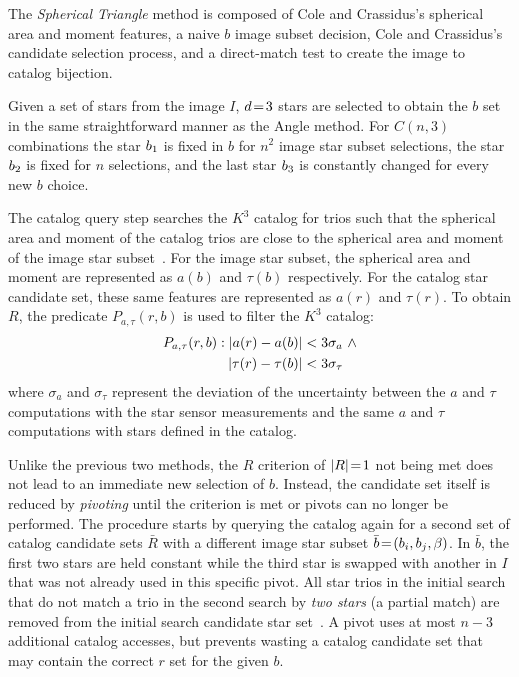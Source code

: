 \documentclass[conference]{IEEEtran}
\begin{document}
    The \textit{Spherical Triangle} method is composed of Cole and Crassidus's spherical area and moment features, a
    naive $b$ image subset decision, Cole and Crassidus's candidate selection process, and a direct-match test to create
    the image to catalog bijection.

    Given a set of stars from the image $I$, $d \!=\! 3$ stars are selected to obtain the $b$ set in the same
    straightforward manner as the Angle method.
    For $C(n, 3)$ combinations the star $b_1$ is fixed in $b$ for $n^2$ image star subset selections,
    the star $b_2$ is fixed for $n$ selections, and the last star $b_3$ is constantly changed for
    every new $b$ choice.

    The catalog query step searches the $K^3$ catalog for trios such that the spherical area and moment of the catalog trios
    are close to the spherical area and moment of the image star subset~\cite{coleAndCrassidis:sphericalTriangleMethod}.
    For the image star subset, the spherical area and moment are represented as $a(b)$ and $\tau(b)$ respectively.
    For the catalog star candidate set, these same features are represented as $a(r)$ and $\tau(r)$.
    To obtain $R$, the predicate $P_{a, \tau}(r, b)$ is used to filter the $K^3$ catalog:
    \begin{equation}
        \begin{aligned}
            P_{a, \tau}(r, b) : \left|  a(r) - a(b) \right| &< 3\sigma_{a}
            \ \land \\ \left| \tau(r) - \tau(b) \right| &< 3\sigma_{\tau}
        \end{aligned}
    \end{equation}
    where $\sigma_{a}$ and $\sigma_{\tau}$ represent the deviation of the uncertainty between the $a$ and $\tau$
    computations with the star sensor measurements and the same $a$ and $\tau$ computations with stars defined in the
    catalog.

    Unlike the previous two methods, the $R$ criterion of $|R| \!=\! 1$ not being met does not lead to an immediate new
    selection of $b$.
    Instead, the candidate set itself is reduced by \textit{pivoting} until the criterion is met or pivots can no longer
    be performed.
    The procedure starts by querying the catalog again for a second set of catalog candidate sets $\bar{R}$ with a
    different image star subset $\bar{b} \!=\! \left(b_i, b_j, \beta\right)$.
    In $\bar{b}$, the first two stars are held constant while the third star is swapped with another in $I$ that was not
    already used in this specific pivot.
    All star trios in the initial search that do not match a trio in the second search by \textit{two stars} (a partial
    match) are removed from the initial search candidate star set~\cite{coleAndCrassidis:sphericalTriangleMethod}.
    A pivot uses at most $n - 3$ additional catalog accesses, but prevents wasting a catalog candidate set that may contain
    the correct $r$ set for the given $b$.
\end{document}
